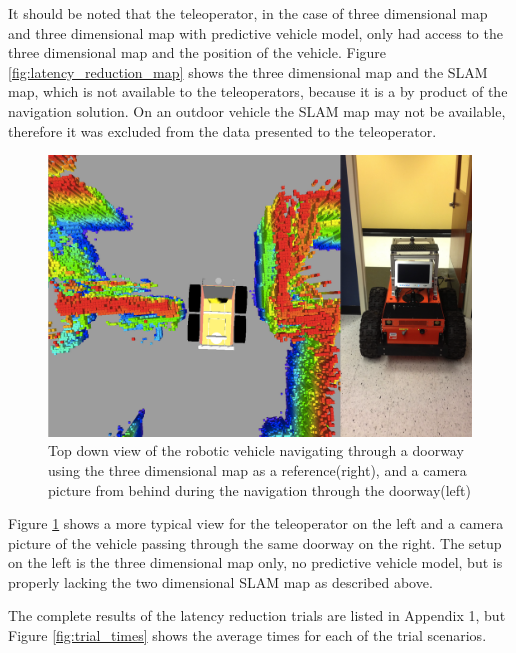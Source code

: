 \documentclass[12pt]{report}
\begin{document}
It should be noted that the teleoperator, in the case of three dimensional map and three dimensional map with predictive vehicle model, only had access to the three dimensional map and the position of the vehicle.  Figure \ref{fig:latency_reduction_map} shows the three dimensional map and the SLAM map, which is not available to the teleoperators, because it is a by product of the navigation solution.  On an outdoor vehicle the SLAM map may not be available, therefore it was excluded from the data presented to the teleoperator.

\begin{figure}[ht]
  \centering
  \includegraphics[width=6.5in,keepaspectratio]{3d_map_doorway.png}
  \caption{Top down view of the robotic vehicle navigating through a doorway using the three dimensional map as a reference(right), and a camera picture from behind during the navigation through the doorway(left)}
  \label{fig:3d_map_doorway}
\end{figure}

Figure \ref{fig:3d_map_doorway} shows a more typical view for the teleoperator on the left and a camera picture of the vehicle passing through the same doorway on the right.  The setup on the left is the three dimensional map only, no predictive vehicle model, but is properly lacking the two dimensional SLAM map as described above.

The complete results of the latency reduction trials are listed in Appendix 1, but Figure \ref{fig:trial_times} shows the average times for each of the trial scenarios.
\end{document}

